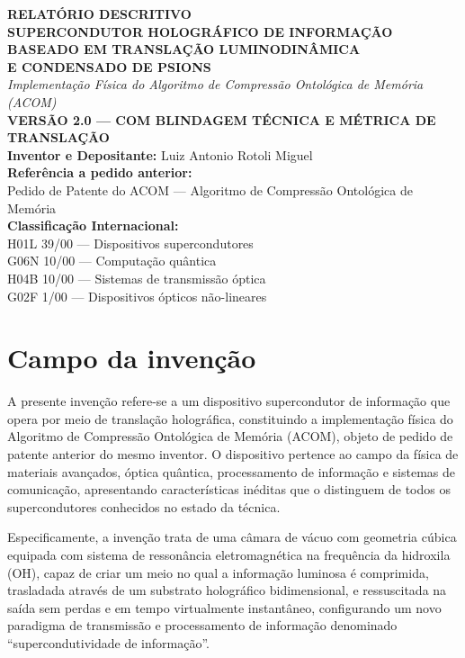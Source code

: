 \documentclass[12pt,a4paper]{article}
\begin{document}
\begin{center}
{\Large\bfseries RELATÓRIO DESCRITIVO}\\[0.8cm]
{\large\bfseries SUPERCONDUTOR HOLOGRÁFICO DE INFORMAÇÃO\\
BASEADO EM TRANSLAÇÃO LUMINODINÂMICA\\
E CONDENSADO DE PSIONS}\\[0.4cm]
{\normalsize\itshape Implementação Física do Algoritmo de
Compressão Ontológica de Memória (ACOM)}\\[0.3cm]
{\normalsize\bfseries VERSÃO 2.0 --- COM BLINDAGEM TÉCNICA
E MÉTRICA DE TRANSLAÇÃO}\\[0.8cm]
\textbf{Inventor e Depositante:} Luiz Antonio Rotoli Miguel\\[0.3cm]
\textbf{Referência a pedido anterior:}\\
Pedido de Patente do ACOM --- Algoritmo de Compressão
Ontológica de Memória\\[0.3cm]
\textbf{Classificação Internacional:}\\
H01L 39/00 --- Dispositivos supercondutores\\
G06N 10/00 --- Computação quântica\\
H04B 10/00 --- Sistemas de transmissão óptica\\
G02F 1/00 --- Dispositivos ópticos não-lineares
\end{center}

\vspace{1cm}

\section{Campo da invenção}

A presente invenção refere-se a um dispositivo supercondutor de
informação que opera por meio de translação holográfica,
constituindo a implementação física do Algoritmo de Compressão
Ontológica de Memória (ACOM), objeto de pedido de patente
anterior do mesmo inventor. O dispositivo pertence ao campo da
física de materiais avançados, óptica quântica, processamento
de informação e sistemas de comunicação, apresentando
características inéditas que o distinguem de todos os
supercondutores conhecidos no estado da técnica.

Especificamente, a invenção trata de uma câmara de vácuo com
geometria cúbica equipada com sistema de ressonância
eletromagnética na frequência da hidroxila (OH), capaz de criar
um meio no qual a informação luminosa é comprimida, trasladada
através de um substrato holográfico bidimensional, e
ressuscitada na saída sem perdas e em tempo virtualmente
instantâneo, configurando um novo paradigma de transmissão e
processamento de informação denominado ``supercondutividade de
informação''.
\end{document}
